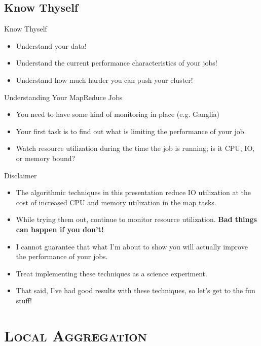 \documentclass[xcolor=x11names,compress]{beamer}
\renewcommand{\(}{\begin{columns}}
\renewcommand{\)}{\end{columns}}
\newcommand{\<}[1]{\begin{column}{#1}}
\renewcommand{\>}{\end{column}}
\begin{document}
\subsection{Know Thyself}
\begin{frame}{Know Thyself}
  \begin{itemize}
  \item<1> Understand your data!
  \item<2,3> Understand the current performance characteristics of your jobs!
  \item<3> Understand how much harder you can push your cluster!
  \end{itemize}
\end{frame}

\begin{frame}{Understanding Your MapReduce Jobs}
  \begin{itemize}
  \item<1,2> You need to have some kind of monitoring in place (e.g. Ganglia)
  \item<2,3> Your first task is to find out what is limiting the
    performance of your job.
  \item<3> Watch resource utilization during the time the job is
    running; is it CPU, IO, or memory bound?
  \end{itemize}
\end{frame}

\begin{frame}{Disclaimer}
  \begin{itemize}
  \item<1,2> The algorithmic techniques in this presentation reduce IO
    utilization at the cost of increased CPU and memory utilization in
    the map tasks.
  \item<2> While trying them out, continue to monitor resource
    utilization. \bf{Bad things can happen if you don't!}
  \item<3,4> I cannot guarantee that what I'm about to show you will
    actually improve the performance of your jobs.
  \item<4> Treat implementing these techniques as a science experiment.
  \item<5> That said, I've had good results with these techniques, so
    let's get to the fun stuff!
  \end{itemize}
\end{frame}

\section{\scshape Local Aggregation}
\end{document}
